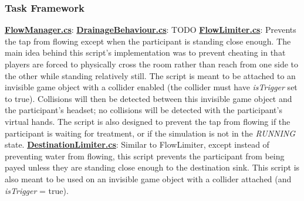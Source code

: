 \documentclass{article}
\begin{document}
\subsubsection*{Task Framework} %
\href{https://bit.ly/2WrbyxT}{\textbf{FlowManager.cs}}: \newline \newline 
\href{https://bit.ly/2YtMEjd}{\textbf{DrainageBehaviour.cs}}: TODO  \newline \newline 
\href{https://bit.ly/2TUX1h4}{\textbf{FlowLimiter.cs}}: Prevents the tap from flowing except when the participant is standing close enough. The main idea behind this script's implementation was to prevent cheating in that players are forced to physically cross the room rather than reach from one side to the other while standing relatively still. The script is meant to be attached to an invisible game object with a collider enabled (the collider must have \textit{isTrigger} set to true). Collisions will then be detected between this invisible game object and the participant's headset; no collisions will be detected with the participant's virtual hands. The script is also designed to prevent the tap from flowing if the participant is waiting for treatment, or if the simulation is not in the \textit{RUNNING} state. \newline \newline
\href{https://bit.ly/2JGhr8M}{\textbf{DestinationLimiter.cs}}: Similar to FlowLimiter, except instead of preventing water from flowing, this script prevents the participant from being payed unless they are standing close enough to the destination sink. This script is also meant to be used on an invisible game object with a collider attached (and \textit{isTrigger} = true). 
\end{document}
